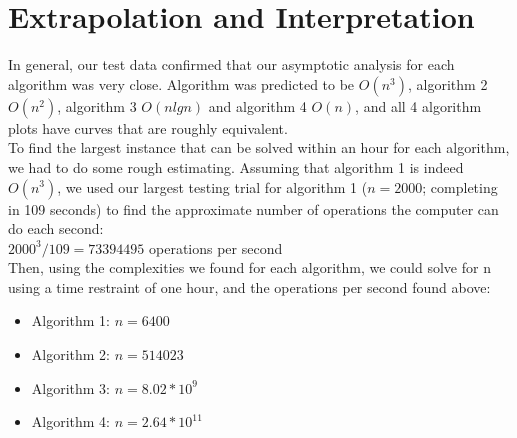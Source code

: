 \documentclass[11pt,letterpaper]{article}
\begin{document}
\section{Extrapolation and Interpretation}
In general, our test data confirmed that our asymptotic analysis for each algorithm was very close. Algorithm was predicted to be $O(n^3)$, algorithm 2 $O(n^2)$, algorithm 3 $O(nlgn)$ and algorithm 4 $O(n)$, and all 4 algorithm plots have curves that are roughly equivalent.\vspace{8pt}
\\
To find the largest instance that can be solved within an hour for each algorithm, we had to do some rough estimating. Assuming that algorithm 1 is indeed $O(n^3)$, we used our largest testing trial for algorithm 1 ($n=2000$; completing in 109 seconds) to find the approximate number of operations the computer can do each second:\vspace{8pt}
\\
\hspace{10mm}$2000^3 / 109 = 73394495$ operations per second\vspace{8pt}
\\
Then, using the complexities we found for each algorithm, we could solve for n using a time restraint of one hour,  and the operations per second found above:\\
\begin{itemize}
\item Algorithm 1: $n=6400$
\item Algorithm 2: $n=514023$
\item Algorithm 3: $n=8.02*10^9$
\item Algorithm 4: $n=2.64*10^{11}$
\end{itemize}
\end{document}
